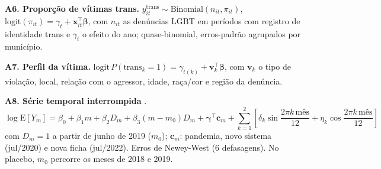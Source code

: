 \documentclass[12pt]{article}
\begin{document}
{\textbf{A6. Proporção de vítimas trans.} $y^{\text{trans}}_{it} \sim \text{Binomial}(n_{it}, \pi_{it})$, $\text{logit}(\pi_{it}) = \gamma_t + \mathbf{x}_{it}^{\top}\boldsymbol{\beta}$, com $n_{it}$ as denúncias LGBT em períodos com registro de identidade trans e $\gamma_t$ o efeito do ano; quase-binomial, erros-padrão agrupados por município.

\textbf{A7. Perfil da vítima.} $\text{logit}\, P(\text{trans}_k = 1) = \gamma_{t(k)} + \mathbf{v}_k^{\top}\boldsymbol{\beta}$, com $\mathbf{v}_k$ o tipo de violação, local, relação com o agressor, idade, raça/cor e região da denúncia.

\textbf{A8. Série temporal interrompida} \cite{bernal:2017}.
\begin{equation*}
\log \mathrm{E}[Y_m] = \beta_0 + \beta_1 m + \beta_2 D_m + \beta_3 (m-m_0) D_m + \boldsymbol{\gamma}^{\top}\mathbf{c}_m + \textstyle\sum_{k=1}^{2}\left[\delta_k \sin\frac{2\pi k\,\text{mês}}{12} + \eta_k \cos\frac{2\pi k\,\text{mês}}{12}\right]
\end{equation*}
com $D_m = 1$ a partir de junho de 2019 ($m_0$); $\mathbf{c}_m$: pandemia, novo sistema (jul/2020) e nova ficha (jul/2022). Erros de Newey-West (6 defasagens). No placebo, $m_0$ percorre os meses de 2018 e 2019.
}




\end{document}
